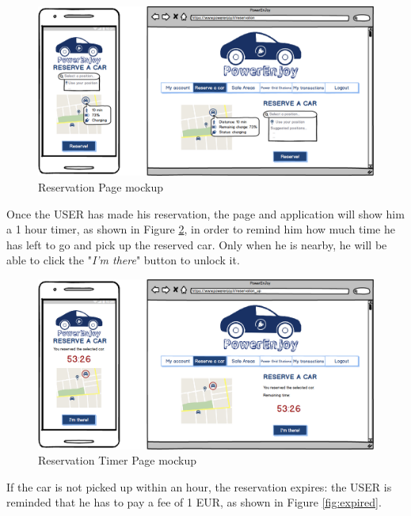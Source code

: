 \vspace{80pt}

\begin{figure}[htbp]
\centering
\includegraphics[width=\textwidth]{Images/Mockups/Reservation}
\caption{Reservation Page mockup}
\label{fig:reservation}
\end{figure}
\clearpage

Once the USER has made his reservation, the page and application will show him a 1 hour timer, as shown in Figure \ref{fig:timer}, in order to remind him how much time he has left to go and pick up the reserved car. Only when he is nearby, he will be able to click the "\textit{I'm there}" button to unlock it.

\vspace{80pt}

\begin{figure}[htbp]
\centering
\includegraphics[width=\textwidth]{Images/Mockups/Timer}
\caption{Reservation Timer Page mockup}
\label{fig:timer}
\end{figure}
\clearpage

If the car is not picked up within an hour, the reservation expires: the USER is reminded that he has to pay a fee of 1 EUR, as shown in Figure \ref{fig:expired}.

